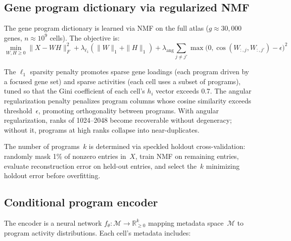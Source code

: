 \documentclass[10pt,twocolumn,letterpaper]{article}
\begin{document}
\subsection{Gene program dictionary via regularized NMF}
\label{sec:nmf}

The gene program dictionary is learned via NMF on the full atlas
($g \approx 30{,}000$ genes, $n \approx 10^9$ cells). The objective is:
\begin{equation}
  \min_{W, H \geq 0} \|X - WH\|_F^2
    + \lambda_{\ell_1}(\|W\|_1 + \|H\|_1)
    + \lambda_{\text{ang}} \!\!\sum_{j \neq j'}\!\!
      \max\!\bigl(0, \cos(W_{:,j}, W_{:,j'}) - \epsilon\bigr)^2
  \label{eq:nmf-obj}
\end{equation}

The $\ell_1$ sparsity penalty promotes sparse gene loadings (each program driven
by a focused gene set) and sparse activities (each cell uses a subset of
programs), tuned so that the Gini coefficient of each cell's $h_i$ vector exceeds
0.7. The angular regularization penalty penalizes program columns whose cosine
similarity exceeds threshold~$\epsilon$, promoting orthogonality between
programs. With angular regularization, ranks of 1024--2048 become recoverable
without degeneracy; without it, programs at high ranks collapse into
near-duplicates.

The number of programs~$k$ is determined via speckled holdout cross-validation:
randomly mask 1\% of nonzero entries in~$X$, train NMF on remaining entries,
evaluate reconstruction error on held-out entries, and select the~$k$ minimizing
holdout error before overfitting.

\subsection{Conditional program encoder}
\label{sec:encoder}

The encoder is a neural network $f_\theta : \mathcal{M} \to
\mathbb{R}_{\geq 0}^k$ mapping metadata space~$\mathcal{M}$ to program activity
distributions. Each cell's metadata includes:
\end{document}
